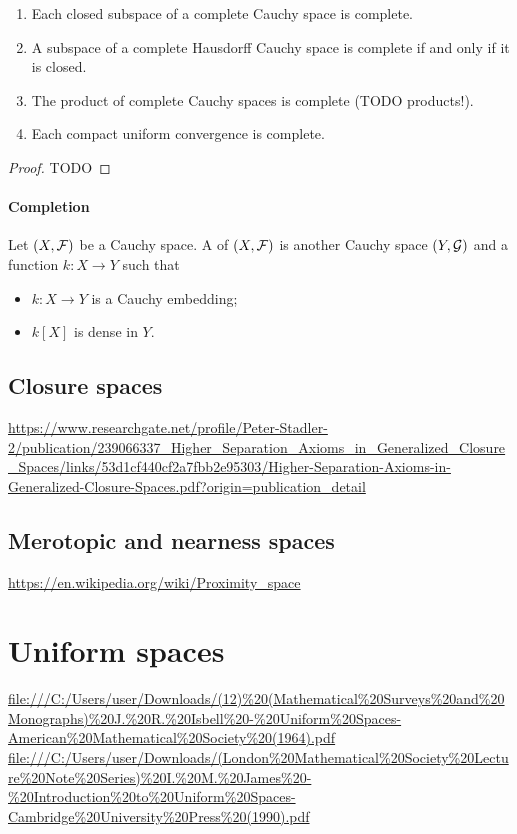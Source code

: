 \begin{proposition}
\begin{enumerate}
\item Each closed subspace of a complete Cauchy space is complete.
\item A subspace of a complete Hausdorff Cauchy space is complete \textup{if and only if} it is closed.
\item The product of complete Cauchy spaces is complete (TODO products!).
\item Each compact uniform convergence is complete.
\end{enumerate}
\end{proposition}
\begin{proof}
TODO
\end{proof}

\subsubsection{Completion}
\begin{definition}
Let $\left( X, \mathcal{F} \right)$ be a Cauchy space. A  of $\left( X, \mathcal{F} \right)$ is another Cauchy space $\left( Y, \mathcal{G} \right)$ and a function $k: X\to Y$ such that
\begin{itemize}
\item $k: X\to Y$ is a Cauchy embedding;
\item $k[X]$ is dense in $Y$.
\end{itemize}
\end{definition}

\section{Closure spaces}
\url{https://www.researchgate.net/profile/Peter-Stadler-2/publication/239066337_Higher_Separation_Axioms_in_Generalized_Closure_Spaces/links/53d1cf440cf2a7fbb2e95303/Higher-Separation-Axioms-in-Generalized-Closure-Spaces.pdf?origin=publication_detail}

\section{Merotopic and nearness spaces}
\url{https://en.wikipedia.org/wiki/Proximity_space}

\chapter{Uniform spaces}
\url{file:///C:/Users/user/Downloads/(12)%20(Mathematical%20Surveys%20and%20Monographs)%20J.%20R.%20Isbell%20-%20Uniform%20Spaces-American%20Mathematical%20Society%20(1964).pdf}
\url{file:///C:/Users/user/Downloads/(London%20Mathematical%20Society%20Lecture%20Note%20Series)%20I.%20M.%20James%20-%20Introduction%20to%20Uniform%20Spaces-Cambridge%20University%20Press%20(1990).pdf}

